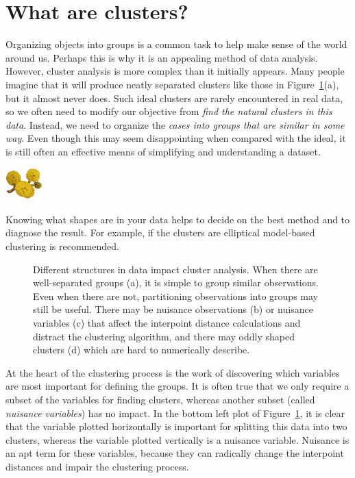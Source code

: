 \documentclass[
  letterpaper,
]{krantz}
\newcommand{\infobox}[1]{%
\noindent\colorbox{info!30}{%
\begin{minipage}{0.98\linewidth}%
    \centering%
    \begin{minipage}[c]{0.15\linewidth} %
      \includegraphics[width=1.5cm]{images/mulga-flowers2.png} %
    \end{minipage}%
    \hfill %
    \begin{minipage}[c]{0.8\linewidth} %
      \bigskip%
      \textsf{#1}%
      \bigskip%
    \end{minipage}%
    \hspace*{3mm}%
  \end{minipage}%
}%
}
\begin{document}
\section{What are clusters?}\label{what-are-clusters}

Organizing objects into groups is a common task to help make sense of
the world around us. Perhaps this is why it is an appealing method of
data analysis. However, cluster analysis is more complex than it
initially appears. Many people imagine that it will produce neatly
separated clusters like those in Figure~\ref{fig-ideal-clusters}(a), but
it almost never does. Such ideal clusters are rarely encountered in real
data, so we often need to modify our objective from \emph{find the
natural clusters in this data}. Instead, we need to organize the
\emph{cases into groups that are similar in some way}. Even though this
may seem disappointing when compared with the ideal, it is still often
an effective means of simplifying and understanding a dataset.

\infobox{Knowing what shapes are in your data helps to decide on the best method and to diagnose the result. For example, if the clusters are elliptical model-based clustering is recommended.}

\begin{figure}


\caption{\label{fig-ideal-clusters}Different structures in data impact
cluster analysis. When there are well-separated groups (a), it is simple
to group similar observations. Even when there are not, partitioning
observations into groups may still be useful. There may be nuisance
observations (b) or nuisance variables (c) that affect the interpoint
distance calculations and distract the clustering algorithm, and there
may oddly shaped clusters (d) which are hard to numerically describe.}

\end{figure}%

At the heart of the clustering process is the work of discovering which
variables are most important for defining the groups. It is often true
that we only require a subset of the variables for finding clusters,
whereas another subset (called \emph{nuisance variables}) has no impact.
In the bottom left plot of Figure~\ref{fig-ideal-clusters}, it is clear
that the variable plotted horizontally is important for splitting this
data into two clusters, whereas the variable plotted vertically is a
nuisance variable. Nuisance is an apt term for these variables, because
they can radically change the interpoint distances and impair the
clustering process. 
\end{document}
